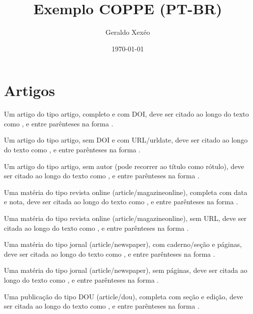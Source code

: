 \documentclass[a4paper,12pt]{article}
\title{Exemplo COPPE (PT-BR)}
\author{Geraldo Xexéo}
\date{\today}
\begin{document}
\maketitle

\section*{Artigos}

Um artigo do tipo artigo, completo e com DOI, deve ser citado ao longo do texto como \citet{art-1-complete-doi}, e entre parênteses na forma \citep{art-1-complete-doi}.


Um artigo do tipo artigo, sem DOI e com URL/urldate, deve ser citado ao longo do texto como \citet{art-2-missing-doi-has-url}, e entre parênteses na forma \citep{art-2-missing-doi-has-url}.


Um artigo do tipo artigo, sem autor (pode recorrer ao título como rótulo), deve ser citado ao longo do texto como \citet{art-3-missing-author}, e entre parênteses na forma \citep{art-3-missing-author}.


Uma matéria do tipo revista online (article/magazineonline), completa com data e nota, deve ser citada ao longo do texto como \citet{mag-1-complete}, e entre parênteses na forma \citep{mag-1-complete}.


Uma matéria do tipo revista online (article/magazineonline), sem URL, deve ser citada ao longo do texto como \citet{mag-2-missing-url}, e entre parênteses na forma \citep{mag-2-missing-url}.


Uma matéria do tipo jornal (article/newspaper), com caderno/seção e páginas, deve ser citada ao longo do texto como \citet{news-1-complete}, e entre parênteses na forma \citep{news-1-complete}.


Uma matéria do tipo jornal (article/newspaper), sem páginas, deve ser citada ao longo do texto como \citet{news-2-missing-pages}, e entre parênteses na forma \citep{news-2-missing-pages}.


Uma publicação do tipo DOU (article/dou), completa com seção e edição, deve ser citada ao longo do texto como \citet{dou-1-complete}, e entre parênteses na forma \citep{dou-1-complete}.
\end{document}
